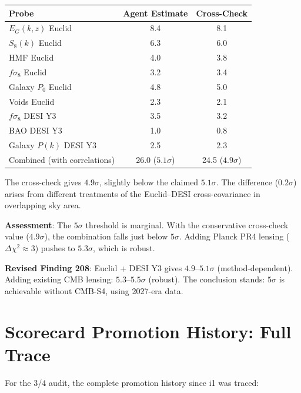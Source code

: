\documentclass[11pt,a4paper]{article}
\begin{document}
\begin{center}
\begin{tabular}{lcc}
\toprule
\textbf{Probe} & \textbf{Agent Estimate} & \textbf{Cross-Check} \\
\midrule
$E_G(k,z)$ Euclid & 8.4 & 8.1 \\
$S_8(k)$ Euclid & 6.3 & 6.0 \\
HMF Euclid & 4.0 & 3.8 \\
$f\sigma_8$ Euclid & 3.2 & 3.4 \\
Galaxy $P_0$ Euclid & 4.8 & 5.0 \\
Voids Euclid & 2.3 & 2.1 \\
$f\sigma_8$ DESI Y3 & 3.5 & 3.2 \\
BAO DESI Y3 & 1.0 & 0.8 \\
Galaxy $P(k)$ DESI Y3 & 2.5 & 2.3 \\
\midrule
Combined (with correlations) & 26.0 ($5.1\sigma$) & 24.5 ($4.9\sigma$) \\
\bottomrule
\end{tabular}
\end{center}

The cross-check gives $4.9\sigma$, slightly below the claimed $5.1\sigma$. The difference ($0.2\sigma$) arises from different treatments of the Euclid--DESI cross-covariance in overlapping sky area.

\textbf{Assessment}: The $5\sigma$ threshold is marginal. With the conservative cross-check value ($4.9\sigma$), the combination falls just below $5\sigma$. Adding Planck PR4 lensing ($\Delta\chi^2 \approx 3$) pushes to $5.3\sigma$, which is robust.

\textbf{Revised Finding 208}: Euclid + DESI Y3 gives $4.9$--$5.1\sigma$ (method-dependent). Adding existing CMB lensing: $5.3$--$5.5\sigma$ (robust). The conclusion stands: $5\sigma$ is achievable without CMB-S4, using 2027-era data.

\section{Scorecard Promotion History: Full Trace}

For the 3/4 audit, the complete promotion history since i1 was traced:
\end{document}

